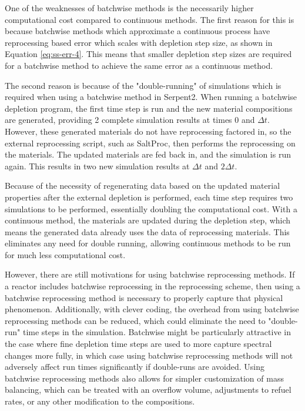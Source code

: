 One of the weaknesses of batchwise methods is the necessarily higher computational cost compared to continuous methods. The first reason for this is because batchwise methods which approximate a continuous process have reprocessing based error which scales with depletion step size, as shown in Equation \eqref{eq:ss-err-4}. This means that smaller depletion step sizes are required for a batchwise method to achieve the same error as a continuous method. 

The second reason is because of the "double-running" of simulations which is required when using a batchwise method in Serpent2. When running a batchwise depletion program, the first time step is run and the new material compositions are generated, providing 2 complete simulation results at times 0 and $\Delta t$. However, these generated materials do not have reprocessing factored in, so the external reprocessing script, such as SaltProc, then performs the reprocessing on the materials. The updated materials are fed back in, and the simulation is run again. This results in two new simulation results at $\Delta t$ and $2 \Delta t$. 

Because of the necessity of regenerating data based on the updated material properties after the external depletion is performed, each time step requires two simulations to be performed, essentially doubling the computational cost. With a continuous method, the materials are updated during the depletion step, which means the generated data already uses the data of reprocessing materials. This eliminates any need for double running, allowing continuous methods to be run for much less computational cost.

However, there are still motivations for using batchwise reprocessing methods. If a reactor includes batchwise reprocessing in the reprocessing scheme, then using a batchwise reprocessing method is necessary to properly capture that physical phenomenon. Additionally, with clever coding, the overhead from using batchwise reprocessing methods can be reduced, which could eliminate the need to "double-run" time steps in the simulation. Batchwise might be particularly attractive in the case where fine depletion time steps are used to more capture spectral changes more fully, in which case using batchwise reprocessing methods will not adversely affect run times significantly if double-runs are avoided. Using batchwise reprocessing methods also allows for simpler customization of mass balancing, which can be treated with an overflow volume, adjustments to refuel rates, or any other modification to the compositions. 

